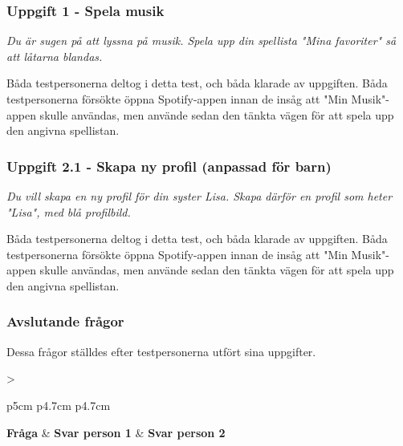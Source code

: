\documentclass[a4paper,12pt,titlepage]{article}
\begin{document}
\subsubsection*{Uppgift 1 - Spela musik}

\textit{%
Du är sugen på att lyssna på musik. Spela upp din spellista "Mina favoriter" så
att låtarna blandas.
}

Båda testpersonerna deltog i detta test, och båda klarade av uppgiften. Båda
testpersonerna försökte öppna Spotify-appen innan de insåg att "Min
Musik"-appen skulle användas, men använde sedan den tänkta vägen för att spela
upp den angivna spellistan.

\subsubsection*{Uppgift 2.1 - Skapa ny profil (anpassad för barn)}

\textit{%
Du vill skapa en ny profil för din syster Lisa. Skapa därför en profil som
heter "Lisa", med blå profilbild.
}

Båda testpersonerna deltog i detta test, och båda klarade av uppgiften. Båda
testpersonerna försökte öppna Spotify-appen innan de insåg att "Min
Musik"-appen skulle användas, men använde sedan den tänkta vägen för att spela
upp den angivna spellistan.

\subsubsection*{Avslutande frågor}

Dessa frågor ställdes efter testpersonerna utfört sina uppgifter.

\begin{longtable}[c]{>\raggedright p{5cm} p{4.7cm} p{4.7cm} }
    \textbf{Fråga} & \textbf{Svar person 1} & \textbf{Svar person 2} \\
    \midrule
\end{longtable}
\end{document}
